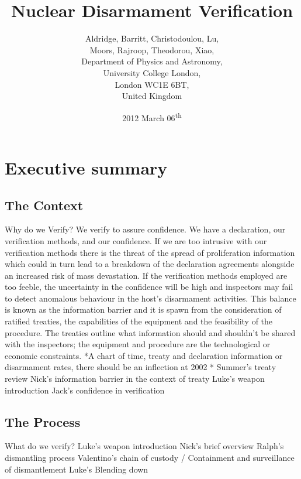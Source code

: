 \documentclass[a4paper]{article}
\begin{document}
\title{Nuclear Disarmament Verification}
\author{Aldridge, Barritt, Christodoulou, Lu, \\
	Moors, Rajroop, Theodorou, Xiao, \\
\small	Department of Physics and Astronomy, \\
\small	University College London, \\
\small	London WC1E 6BT, \\
\small	United Kingdom}
\date{2012 March 06\textsuperscript{th}}
\maketitle

\section*{Executive summary}
\subsection*{The Context}
  Why do we Verify?
We verify to assure confidence. We have a declaration, our verification methods, and our confidence. If we are too intrusive with our verification methods there is the threat of the spread of proliferation information which could in turn lead to a breakdown of the declaration agreements alongside an increased risk of mass devastation. If the verification methods employed are too feeble, the uncertainty in the confidence will be high and inspectors may fail to detect anomalous behaviour in the host’s disarmament activities.
This balance is known as the information barrier and it is spawn from the consideration of ratified treaties, the capabilities of the equipment and the feasibility of the procedure. The treaties outline what information should and shouldn’t be shared with the inspectors; the equipment and procedure are the technological or economic constraints.
*A chart of time, treaty and declaration information or disarmament rates, there should be an inflection at 2002 *
Summer’s treaty review
Nick’s information barrier in the context of treaty
Luke’s weapon introduction
Jack’s confidence in verification
\subsection*{The Process}
	What do we verify?
Luke’s weapon introduction
Nick’s brief overview 
Ralph’s dismantling process
Valentino’s chain of custody / Containment and surveillance of dismantlement 
Luke’s Blending down
\end{document}
